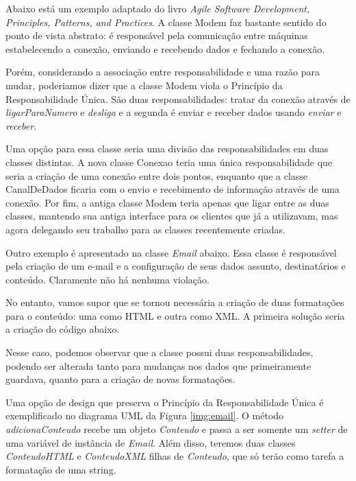 Abaixo está um exemplo adaptado do livro \textit{Agile Software Development, Principles, Patterns, and
Practices}. A classe Modem faz bastante sentido do ponto de vista abstrato: é responsável pela comunicação entre máquinas estabelecendo a conexão, enviando e recebendo dados e fechando a conexão.



Porém, considerando a associação entre responsabilidade e uma razão para mudar, poderiamos dizer que a classe
Modem viola o Princípio da Responsabilidade Única. São duas responsabilidades: tratar da conexão através de 
\textit{ligarParaNumero} e \textit{desliga} e a segunda é enviar e receber dados usando \textit{enviar} e
\textit{receber}.

Uma opção para essa classe seria uma divisão das responsabilidades em duas classes distintas. A nova classe 
Conexao teria uma única responsabilidade que seria a criação de uma conexão entre dois pontos, enquanto que a 
classe CanalDeDados ficaria com o envio e recebimento de informação através de uma conexão. Por fim, a antiga 
classe Modem teria apenas que ligar entre as duas classes, mantendo sua antiga interface para os clientes que 
já a utilizavam, mas agora delegando seu trabalho para as classes recentemente criadas.

Outro exemplo é apresentado na classe \textit{Email} abaixo. Essa classe é responsável pela criação de um 
e-mail e a configuração de seus dados assunto, destinatários e conteúdo. Claramente não há nenhuma violação.



No entanto, vamos supor que se tornou necessária a criação de duas formatações para o conteúdo: uma como HTML e 
outra como XML. A primeira solução seria a criação do código abaixo.



Nesse caso, podemos observar que a classe possui duas responsabilidades, podendo ser alterada tanto para 
mudanças nos dados que primeiramente guardava, quanto para a criação de novas formatações.

Uma opção de design que preserva o Princípio da Responsabilidade Única é exemplificado no diagrama UML da Figura \ref{img:email}.
O método \textit{adicionaConteudo} recebe um objeto \textit{Conteudo} e passa a ser somente um \textit{setter} de uma variável de instância de \textit{Email}. Além 
disso, teremos duas classes \textit{ConteudoHTML} e \textit{ConteudoXML} filhas de \textit{Conteudo}, que só terão como tarefa a formatação de uma string.

